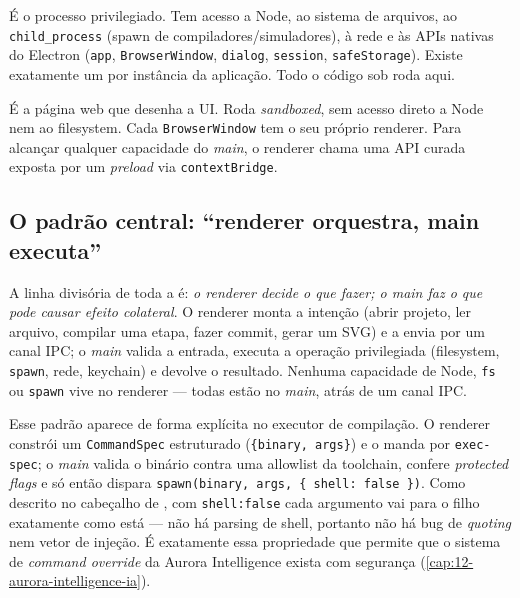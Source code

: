 \begin{description}[leftmargin=*]
  \item[Processo \emph{main} (Node.js)] É o processo privilegiado. Tem acesso a
    Node, ao sistema de arquivos, ao \lstinline|child_process| (spawn de
    compiladores/simuladores), à rede e às APIs nativas do Electron
    (\lstinline|app|, \lstinline|BrowserWindow|, \lstinline|dialog|,
    \lstinline|session|, \lstinline|safeStorage|). Existe exatamente um por
    instância da aplicação. Todo o código sob  roda aqui.
  \item[Processo \emph{renderer} (Chromium)] É a página web que desenha a UI.
    Roda \emph{sandboxed}, sem acesso direto a Node nem ao filesystem. Cada
    \lstinline|BrowserWindow| tem o seu próprio renderer. Para alcançar qualquer
    capacidade do \emph{main}, o renderer chama uma API curada exposta por um
    \emph{preload} via \lstinline|contextBridge|.
\end{description}

\subsection{O padrão central: ``renderer orquestra, main executa''}
\label{sec:05-padrao-central}

A linha divisória de toda a  é: \emph{o renderer decide o que fazer;
o main faz o que pode causar efeito colateral}. O renderer monta a intenção
(abrir projeto, ler arquivo, compilar uma etapa, fazer commit, gerar um SVG) e a
envia por um canal IPC; o \emph{main} valida a entrada, executa a operação
privilegiada (filesystem, \lstinline|spawn|, rede, keychain) e devolve o
resultado. Nenhuma capacidade de Node, \lstinline|fs| ou \lstinline|spawn| vive
no renderer --- todas estão no \emph{main}, atrás de um canal IPC.

Esse padrão aparece de forma explícita no executor de compilação. O renderer
constrói um \lstinline|CommandSpec| estruturado (\lstinline|{binary, args}|) e o
manda por \lstinline|exec-spec|; o \emph{main} valida o binário contra uma
allowlist da toolchain, confere \emph{protected flags} e só então dispara
\lstinline|spawn(binary, args, { shell: false })|. Como descrito no cabeçalho de
, com \lstinline|shell:false| cada argumento vai
para o filho exatamente como está --- não há parsing de shell, portanto não há
bug de \emph{quoting} nem vetor de injeção. É exatamente essa propriedade que
permite que o sistema de \emph{command override} da Aurora Intelligence exista
com segurança (\autoref{cap:12-aurora-intelligence-ia}).

